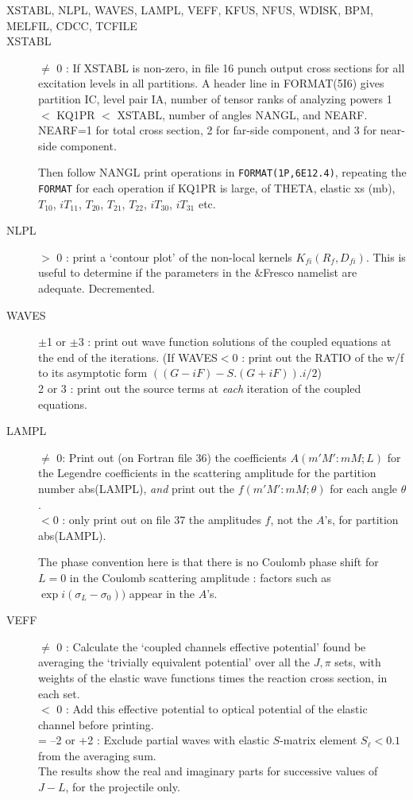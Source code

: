 \documentclass[11pt]{article}
\begin{document}
\begin{description}
\item[XSTABL, NLPL, WAVES, LAMPL, VEFF, KFUS, NFUS, WDISK, BPM, MELFIL, CDCC,  TCFILE]

\item[XSTABL] $\neq$ 0 : If XSTABL is non-zero, in file 16 punch output cross sections
for all excitation levels in all partitions.
A header line in FORMAT(5I6) gives partition IC, level pair IA,
number of tensor ranks of analyzing powers 1 $<$ KQ1PR $<$ XSTABL,
number of angles NANGL, and NEARF.  NEARF=1 for total cross section,
2 for far-side component, and 3 for near-side component.

Then follow NANGL print operations in
{\tt FORMAT(1P,6E12.4)}, repeating
the {\tt FORMAT} for each operation if KQ1PR is large,
of THETA, elastic xs (mb), $T_{10}$, $iT_{11}$,
$T_{20}$, $ T_{21}$, $ T_{22}$, $ iT_{30}$, $ iT_{31}$
etc.

\item[NLPL]   $>$ 0 : print a `contour plot' of the non-local kernels
$K_{fi}(R_{f},D_{fi})$.  This is useful to determine if the parameters in the \&Fresco namelist
are adequate.  Decremented.

\item[WAVES]
  $\pm$1 or $\pm$3 : print out wave function solutions of the coupled
equations at the end of the iterations.
(If WAVES$<$0 : print out the RATIO of the w/f to its asymptotic
form $((G-iF) - S.(G+iF)).i/2$)
\\  2 or 3     : print out the source terms at
{\em each} iteration of the coupled equations.



\item[LAMPL]
  $\neq$ 0: Print out (on Fortran file 36)
the coefficients $A(m'M':mM; L)$ for the Legendre
coefficients in the scattering amplitude for the partition number
abs(LAMPL),
{\em and}
print out the $f(m'M':mM; \theta)$ for each angle $\theta$.
\\ $<$0 : only print out on file 37 the amplitudes $f$, not the $A$'s,
for partition abs(LAMPL).

The phase convention here is that there is no Coulomb phase shift
for $L = 0$ in the Coulomb scattering amplitude : factors such as
$\exp i(\sigma_L-\sigma_0))$  appear in the $A$'s.


\item[VEFF]
  $\neq$ 0 : Calculate the `coupled channels effective potential'
found be averaging the `trivially equivalent potential' over all
the $J,\pi$ sets, with weights of the elastic wave functions
times the reaction cross section, in each set.
\\  $<$  0 : Add this effective potential to optical potential
of the elastic channel before printing.
\\  = --2 or +2 : Exclude partial waves with elastic $S$-matrix element
$S_\ell< 0.1$ from the averaging sum.
\\ The results show the real and imaginary parts for successive
values of $J-L$, for the projectile only.


\end{description}
\end{document}
